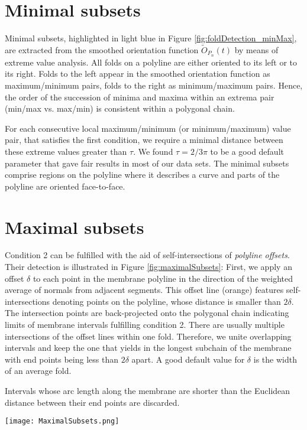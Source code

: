 \documentclass[twocolumn,a4paper]{article}
\begin{document}
\section{Minimal subsets}
Minimal subsets, highlighted in light blue in Figure \ref{fig:foldDetection_minMax}, are extracted from the smoothed orientation function $\tilde{O}_{P_n}(t)$ by means of extreme value analysis. 
All folds on a polyline are either oriented to its left or to its right. 
Folds to the left appear in the smoothed orientation function as maximum/minimum pairs, folds to the right as minimum/maximum pairs.
Hence, the order of the succession of minima and maxima within an extrema pair (min/max vs. max/min) is consistent within a polygonal chain. 

For each consecutive local maximum/minimum (or minimum/maximum) value pair, that satisfies the first condition, we require a minimal distance between these extreme values greater than $\tau$. We found $\tau = 2/3 \pi$ to be a good default parameter that gave fair results in most of our data sets. 
The minimal subsets comprise regions on the polyline where it describes a curve and parts of the polyline are oriented face-to-face.



\section{Maximal subsets}
Condition 2 can be fulfilled with the aid of self-intersections of \emph{polyline offsets}. Their detection is illustrated in Figure \ref{fig:maximalSubsets}: First, we apply an offset $\delta$ to each point in the membrane polyline in the direction of the weighted average of normals from adjacent segments. This offset line (orange) features self-intersections denoting points on the polyline, whose distance is smaller than $2\delta$. The intersection points are back-projected onto the polygonal chain indicating limits of membrane intervals fulfilling condition 2.
There are usually multiple intersections of the offset lines within one fold. 
Therefore, we unite overlapping intervals and keep the one that yields in the longest subchain of the membrane with end points being less than $2\delta$ apart. A good default value for $\delta$ is the width of an average fold.

Intervals whose arc length along the membrane are shorter than the Euclidean distance between their end points are discarded.

\begin{figure*}[htbp]
    \centering
    \texttt{[image: MaximalSubsets.png]}
    \caption{\label{fig:maximalSubsets}
        Procedure of obtaining maximal subsets. The orange polyline results from offsetting the original membrane line by the value $\delta$. Its self intersections (marked in yellow, green, red) are translated into intervals and overlapping intervals are merged. Intervals whose arc length along the membrane are shorter than the Euclidean distance between their end points are discarded. }
\end{figure*}
\end{document}
